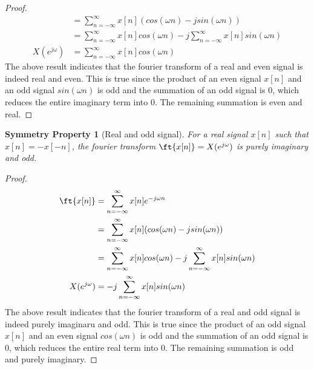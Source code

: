 \documentclass{home_assignment}
\newtheorem{subtheorem}{Symmetry Property}[theorem]
\begin{document}
{\begin{proof}
\begin{equation*}
\begin{aligned}
                            &=\sum_{n=-\infty}^{\infty} x[n] (cos(\omega n)-jsin(\omega n))\\
                            &=\sum_{n=-\infty}^{\infty} x[n] cos(\omega n)-j \sum_{n=-\infty}^{\infty} x[n]sin(\omega n)\\
                            X(e^{j\omega})&=\sum_{n=-\infty}^{\infty} x[n] cos(\omega n)
                        \end{aligned}
                        \end{equation*}
                        The above result indicates that the fourier transform of a real and even signal is indeed real and even. This is true since the product of an even signal $x[n]$ and an odd signal $sin(\omega n)$ is odd and the summation of an odd signal is 0, which reduces the entire imaginary term into 0. The remaining summation is even and real.
                    \end{proof}
                    \begin{subtheorem}[Real and odd signal]
                        For a real signal $x[n]$ such that $x[n]=-x[-n]$,
                         the fourier transform $\ft{x[n]}=X(e^{j\omega})$ is purely imaginary and odd.
                            \end{subtheorem}
                            \begin{proof}
                               \begin{equation*}
                                \begin{aligned} 
                                    \ft{x[n]}&=\sum_{n=-\infty}^{\infty} x[n] e^{-j\omega n}\\
                                    &=\sum_{n=-\infty}^{\infty} x[n] (cos(\omega n)-jsin(\omega n))\\
                                    &=\sum_{n=-\infty}^{\infty} x[n] cos(\omega n)-j \sum_{n=-\infty}^{\infty} x[n]sin(\omega n)\\
                                    X(e^{j\omega})&=-j \sum_{n=-\infty}^{\infty} x[n]sin(\omega n)
                                \end{aligned}
                                \end{equation*}
                                The above result indicates that the fourier transform of a real and odd signal is indeed purely imaginaru and odd. This is true since the product of an odd signal $x[n]$ and an even signal $cos(\omega n)$ is odd and the summation of an odd signal is 0, which reduces the entire real term into 0. The remaining summation is  odd and purely imaginary.

\end{proof}}
\end{document}

